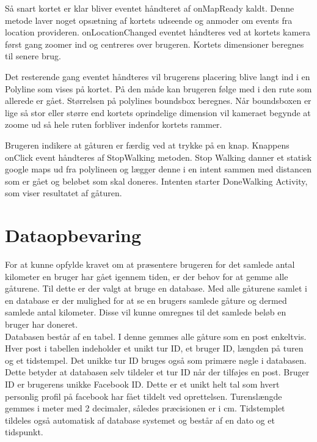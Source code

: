 Så snart kortet er klar bliver eventet håndteret af onMapReady kaldt. Denne metode laver noget opsætning af kortets udseende og anmoder om events fra location provideren. onLocationChanged eventet håndteres ved at kortets kamera først gang zoomer ind og centreres over brugeren. Kortets dimensioner beregnes til senere brug.

Det resterende gang eventet håndteres vil brugerens placering blive langt ind i en Polyline som vises på kortet. På den måde kan brugeren følge med i den rute som allerede er gået. Størrelsen på polylines boundsbox beregnes. Når boundsboxen er lige så stor eller større end kortets oprindelige dimension vil kameraet begynde at zoome ud så hele ruten forbliver indenfor kortets rammer.

Brugeren indikere at gåturen er færdig ved at trykke på en knap. Knappens onClick event håndteres af StopWalking metoden. Stop Walking danner et statisk google maps ud fra polylineen og lægger denne i en intent sammen med distancen som er gået og beløbet som skal doneres. Intenten starter DoneWalking Activity, som viser resultatet af gåturen.




\FloatBarrier
\section{Dataopbevaring}
For at kunne opfylde kravet om at præsentere brugeren for det samlede antal kilometer en bruger har gået igennem tiden, er der behov for at gemme alle gåturene. Til dette er der valgt at bruge en database. Med alle gåturene samlet i en database er der mulighed for at se en brugers samlede gåture og dermed samlede antal kilometer. Disse vil kunne omregnes til det samlede beløb en bruger har doneret.\\
Databasen består af en tabel. I denne gemmes alle gåture som en post enkeltvis. Hver post i tabellen indeholder et unikt tur ID, et bruger ID, længden på turen og et tidstempel.
Det unikke tur ID bruges også som primære nøgle i databasen. Dette betyder at databasen selv tildeler et tur ID når der tilføjes en post. Bruger ID er brugerens unikke Facebook ID. Dette er et unikt helt tal som hvert personlig profil på facebook har fået tildelt ved oprettelsen. Turenslængde gemmes i meter med 2 decimaler, således præcisionen er i cm. Tidstemplet tildeles også automatisk af database systemet og består af en dato og et tidspunkt.\\

